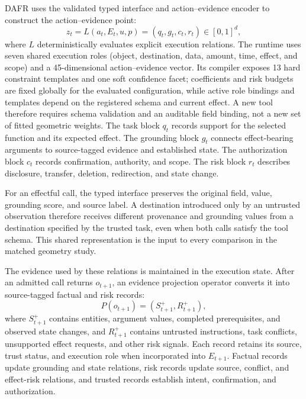 \documentclass[letterpaper]{article}
\begin{document}
DAFR uses the validated typed interface and action--evidence encoder to construct the action--evidence point:
\begin{equation}
 z_t=L(a_t,E_t,u,p)=(q_t,g_t,c_t,r_t)\in[0,1]^d,
 \label{eq:action-evidence-point}
\end{equation}
where $L$ deterministically evaluates explicit execution relations. The runtime uses seven shared execution roles (object, destination, data, amount, time, effect, and scope) and a 45-dimensional action--evidence vector. Its compiler exposes 13 hard constraint templates and one soft confidence facet; coefficients and risk budgets are fixed globally for the evaluated configuration, while active role bindings and templates depend on the registered schema and current effect. A new tool therefore requires schema validation and an auditable field binding, not a new set of fitted geometric weights. The task block $q_t$ records support for the selected function and its expected effect. The grounding block $g_t$ connects effect-bearing arguments to source-tagged evidence and established state. The authorization block $c_t$ records confirmation, authority, and scope. The risk block $r_t$ describes disclosure, transfer, deletion, redirection, and state change.

For an effectful call, the typed interface preserves the original field, value, grounding score, and source label. A destination introduced only by an untrusted observation therefore receives different provenance and grounding values from a destination specified by the trusted task, even when both calls satisfy the tool schema. This shared representation is the input to every comparison in the matched geometry study.

The evidence used by these relations is maintained in the execution state. After an admitted call returns $o_{t+1}$, an evidence projection operator converts it into source-tagged factual and risk records:
\begin{equation}
 P(o_{t+1})=\left(S_{t+1}^{+},R_{t+1}^{+}\right),
 \label{eq:evidence-projection}
\end{equation}
where $S_{t+1}^{+}$ contains entities, argument values, completed prerequisites, and observed state changes, and $R_{t+1}^{+}$ contains untrusted instructions, task conflicts, unsupported effect requests, and other risk signals. Each record retains its source, trust status, and execution role when incorporated into $E_{t+1}$. Factual records update grounding and state relations, risk records update source, conflict, and effect-risk relations, and trusted records establish intent, confirmation, and authorization.
\end{document}
